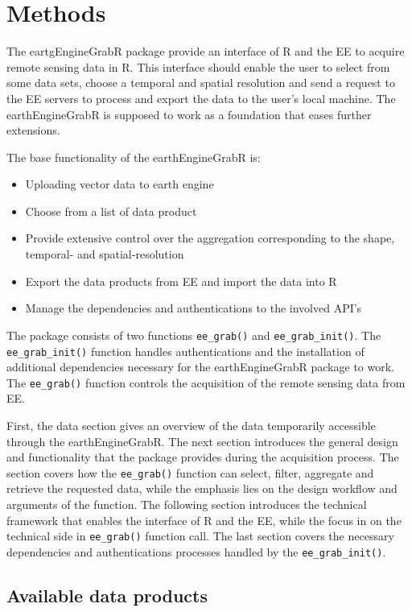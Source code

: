 \chapter{Methods}

The eartgEngineGrabR package provide an interface of R and the EE to acquire remote sensing data in R. This interface should enable the user to select from some data sets, choose a temporal and spatial resolution and send a request to the EE servers to process and export the data to the user's local machine. The earthEngineGrabR is supposed to work as a foundation that eases further extensions.

The base functionality of the earthEngineGrabR is: 
\begin{itemize}
	\item Uploading vector data to earth engine
	\item Choose from a list of data product
	\item Provide extensive control over the aggregation corresponding to the shape, temporal- and spatial-resolution
	\item Export the data products from EE and import the data into R
	\item Manage the dependencies and authentications to the involved API's
\end{itemize}

The package consists of two functions \mbox{\texttt{ee\_grab()}} and \mbox{\texttt{ee\_grab\_init()}}. The \texttt{ee\_grab\_init()} function handles authentications and the installation of additional dependencies necessary for the earthEngineGrabR package to work. The \texttt{ee\_grab()} function controls the acquisition of the remote sensing data from EE.

First, the data section gives an overview of the data temporarily accessible through the earthEngineGrabR. 
The next section introduces the general design and functionality that the package provides during the acquisition process. The section covers how the \texttt{ee\_grab()} function can select, filter, aggregate and retrieve the requested data, while the emphasis lies on the design workflow and arguments of the function.
The following section introduces the technical framework that enables the interface of R and the EE, while the focus in on the technical side in \texttt{ee\_grab()} function call.
The last section covers the necessary dependencies and authentications processes handled by the \texttt{ee\_grab\_init()}.

\section{Available data products}

